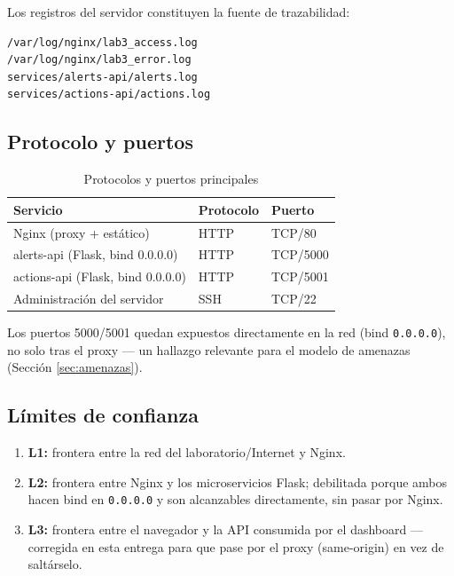 \documentclass[journal]{IEEEtran}
\begin{document}
Los registros del servidor constituyen la fuente de trazabilidad:

\begin{lstlisting}[language=bash]
/var/log/nginx/lab3_access.log
/var/log/nginx/lab3_error.log
services/alerts-api/alerts.log
services/actions-api/actions.log
\end{lstlisting}

\subsection{Protocolo y puertos}

\begin{table}[H]
\centering
\caption{Protocolos y puertos principales}
\label{tab:protocolos}
\begin{tabular}{|p{2.7cm}|p{1.6cm}|p{2cm}|}
\hline
\textbf{Servicio} & \textbf{Protocolo} & \textbf{Puerto} \\
\hline
Nginx (proxy + estático) & HTTP & TCP/80 \\
\hline
alerts-api (Flask, bind 0.0.0.0) & HTTP & TCP/5000 \\
\hline
actions-api (Flask, bind 0.0.0.0) & HTTP & TCP/5001 \\
\hline
Administración del servidor & SSH & TCP/22 \\
\hline
\end{tabular}
\end{table}

Los puertos 5000/5001 quedan expuestos directamente en la red (bind
\texttt{0.0.0.0}), no solo tras el proxy --- un hallazgo relevante para el
modelo de amenazas (Sección \ref{sec:amenazas}).

\subsection{Límites de confianza}

\begin{enumerate}
    \item \textbf{L1:} frontera entre la red del laboratorio/Internet y Nginx.
    \item \textbf{L2:} frontera entre Nginx y los microservicios Flask;
    debilitada porque ambos hacen bind en \texttt{0.0.0.0} y son alcanzables
    directamente, sin pasar por Nginx.
    \item \textbf{L3:} frontera entre el navegador y la API consumida por el
    dashboard --- corregida en esta entrega para que pase por el proxy
    (same-origin) en vez de saltárselo.
\end{enumerate}
\end{document}
